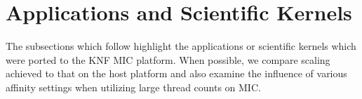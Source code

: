 
\section{Applications and Scientific Kernels}
\label{sec:apps}

The subsections which follow highlight the applications or scientific
kernels which were ported to the KNF MIC platform. When possible, we
compare scaling achieved to that on the host platform and also examine
the influence of various affinity settings when utilizing large thread
counts on MIC.



